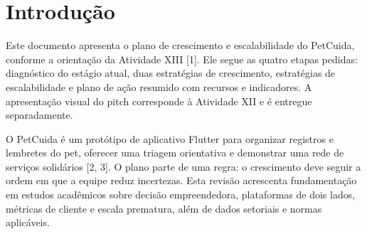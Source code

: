 \section{Introdução}

Este documento apresenta o plano de crescimento e escalabilidade do PetCuida, conforme a orientação da Atividade XIII [1]. Ele segue as quatro etapas pedidas: diagnóstico do estágio atual, duas estratégias de crescimento, estratégias de escalabilidade e plano de ação resumido com recursos e indicadores. A apresentação visual do pitch corresponde à Atividade XII e é entregue separadamente.

O PetCuida é um protótipo de aplicativo Flutter para organizar registros e lembretes do pet, oferecer uma triagem orientativa e demonstrar uma rede de serviços solidários [2, 3]. O plano parte de uma regra: o crescimento deve seguir a ordem em que a equipe reduz incertezas. Esta revisão acrescenta fundamentação em estudos acadêmicos sobre decisão empreendedora, plataformas de dois lados, métricas de cliente e escala prematura, além de dados setoriais e normas aplicáveis.

